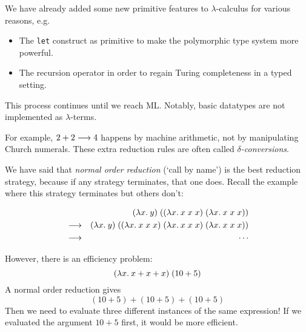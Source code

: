 \begin{slide*}


\vspace*{0.5cm}

We have already added some new primitive features to $\lambda$-calculus for
various reasons, e.g.

\begin{itemize}

\item The {\tt let} construct as primitive to make the
polymorphic type system more powerful.

\item The recursion operator in order to regain Turing completeness in a typed
setting.

\end{itemize}

This process continues until we reach ML. Notably, basic datatypes are not
implemented as $\lambda$-terms.

For example, {\red $2 + 2 \longrightarrow 4$} happens by machine arithmetic, not by
manipulating Church numerals. These extra reduction rules are often called
{\em $\delta$-conversions}.

\end{slide*}


\begin{slide*}


\vspace*{0.5cm}

We have said that {\em normal order reduction} (`call by name') is the best
reduction strategy, because if any strategy terminates, that one does. Recall
the example where this strategy terminates but others don't:
\begin{red}
\begin{eqnarray*}
& & (\lambda x.\: y)\; ((\lambda x.\: x\; x\; x)\; (\lambda x.\: x\; x\; x)) \\
& \longrightarrow & (\lambda x.\: y)\; ((\lambda x.\: x\; x\; x)\; (\lambda x.\: x\; x\; x)\;
                            (\lambda x.\: x\; x\; x))               \\
& \longrightarrow & \cdots
\end{eqnarray*}
\end{red}
However, there is an efficiency problem:
{\red $$ (\lambda x.\: x + x + x)\; (10 + 5) $$}
A normal order reduction gives
{\red $$ (10 + 5) + (10 + 5) + (10 + 5) $$}
Then we need to evaluate three different instances of the same expression! If
we evaluated the argument {\red $10 + 5$} first, it would be more efficient.

\end{slide*}



